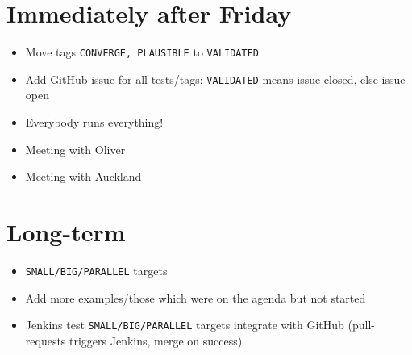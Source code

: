 \section{Immediately after Friday}

\begin{itemize}
	\item Move tags \texttt{CONVERGE, PLAUSIBLE} to \texttt{VALIDATED}
	\item Add GitHub issue for all tests/tags; \texttt{VALIDATED} means issue closed, else issue open
	\item Everybody runs everything!
	\item Meeting with Oliver
	\item Meeting with Auckland
\end{itemize}
	
\section{Long-term}
\begin{itemize}
	\item \texttt{SMALL/BIG/PARALLEL} targets
	\item Add more examples/those which were on the agenda but not started
	\item Jenkins
	\subitem test \texttt{SMALL/BIG/PARALLEL} targets
	\subitem integrate with GitHub (pull-requests triggers Jenkins, merge on success)
\end{itemize}


